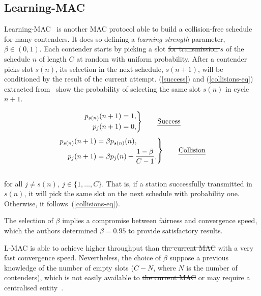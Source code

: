\documentclass[a4paper,journal]{IEEEtran}
\providecommand{\DIFaddtex}[1]{{\protect\color{blue}\uwave{#1}}} %
\providecommand{\DIFdeltex}[1]{{\protect\color{red}\sout{#1}}}                      %
\providecommand{\DIFaddbegin}{} %
\providecommand{\DIFaddend}{} %
\providecommand{\DIFdelbegin}{} %
\providecommand{\DIFdelend}{} %
\providecommand{\DIFadd}[1]{\texorpdfstring{\DIFaddtex{#1}}{#1}} %
\providecommand{\DIFdel}[1]{\texorpdfstring{\DIFdeltex{#1}}{}} %
\begin{document}
\subsection{Learning-MAC}

Learning-MAC~\cite{L_MAC} is another MAC protocol able to build a collision-free schedule for many contenders. It does so defining a \emph{learning strength} parameter, $\beta\in(0,1)$. Each contender starts by picking a slot \DIFdelbegin \DIFdel{for transmission $s$ }\DIFdelend \DIFaddbegin \DIFadd{$s$ for transmission }\DIFaddend of the schedule $n$ of length $C$ at random with uniform probability. After a contender picks slot $s(n)$, its selection in the next schedule, $s(n+1)$, will be conditioned by the result of the current attempt. (\ref{success}) and (\ref{collisions-eq}) extracted from~\cite{L_MAC} show the probability of selecting the same slot $s(n)$ in cycle $n+1$.

\begin{equation} \label{success}
		\left. \begin{aligned}
			p_{s(n)}(n+1)&=1,\\
			p_{j}(n+1)&=0,
		\end{aligned}
	\right\}
	\qquad \text{\emph{Success}}
\end{equation}
\begin{equation} \label{collisions-eq}
	\left. \begin{aligned}
			p_{s(n)}(n+1)&=\beta p_{s(n)}(n),\\
			p_{j}(n+1)&=\beta p_{j}(n)+\frac{1-\beta}{C -1},
		\end{aligned}
	\right\}
	\qquad \text{\emph{Collision}}
\end{equation}
\\
for all $j\neq s(n),~j\in \{1,\dots ,C\}$. That is, if a station successfully transmitted in $s(n)$, it will pick the same slot on the next schedule with probability one. Otherwise, it follows~(\ref{collisions-eq}).

The selection of $\beta$ implies a compromise between fairness and convergence speed, which the authors determined $\beta=0.95$ to provide satisfactory results.

L-MAC is able to achieve higher throughput than \DIFdelbegin \DIFdel{the current MAC }\DIFdelend \DIFaddbegin \DIFadd{CSMA/CA }\DIFaddend with a very fast convergence speed. Nevertheless, the choice of $\beta$ suppose a previous knowledge of the number of empty slots ($C-N$, where $N$ is the number of contenders), which is not easily available to \DIFdelbegin \DIFdel{the current MAC }\DIFdelend \DIFaddbegin \DIFadd{CSMA/CA }\DIFaddend or may require a centralised entity~\cite{barcelo2011tcf}.
\end{document}
